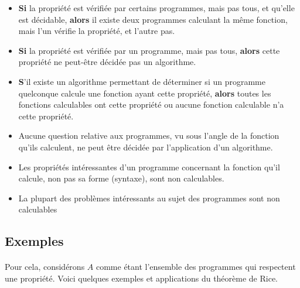 \begin{itemize}
	\item \textbf{Si} la propriété est vérifiée par certains programmes, mais pas tous,
		et qu'elle est décidable, \textbf{alors} il existe deux programmes calculant la
		même fonction, mais l'un vérifie la propriété, et l'autre pas.

	\item \textbf{Si} la propriété est vérifiée par un programme, mais pas tous,
		\textbf{alors} cette propriété ne peut-être décidée pas un algorithme.

	\item \textbf{S}'il existe un algorithme permettant de déterminer si un
		programme quelconque calcule une fonction ayant cette propriété,
		\textbf{alors} toutes les fonctions calculables ont cette propriété ou
		aucune fonction calculable n'a cette propriété.

	\item Aucune question relative aux programmes, vu sous l'angle de la
		fonction qu'ils calculent, ne peut être décidée par
		l'application d'un algorithme.

	\item Les propriétés intéressantes d'un programme concernant la
		fonction qu'il calcule, non pas sa forme (syntaxe), sont non calculables.
		
	\item La plupart des problèmes intéressants au sujet des programmes sont non calculables
\end{itemize}

\subsection{Exemples}

\paragraph{}Pour cela, considérons $A$ comme étant l'ensemble des programmes qui
respectent une propriété. Voici quelques exemples et applications du théorème de Rice.

